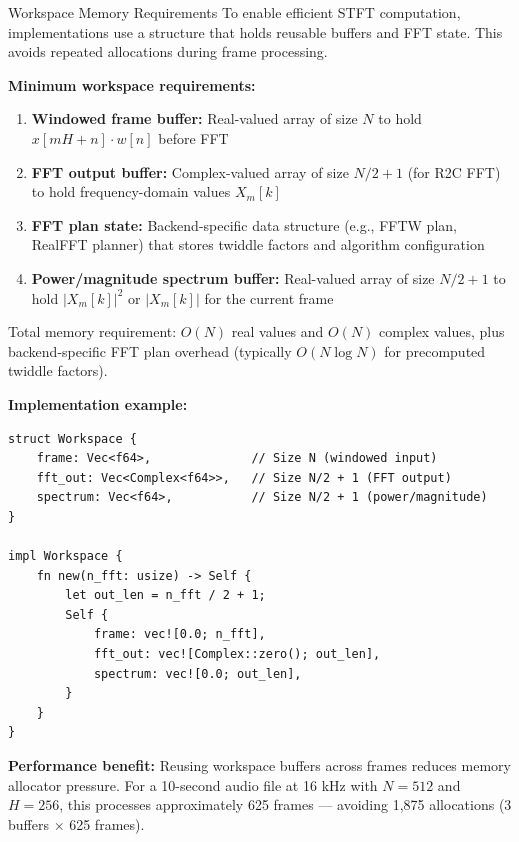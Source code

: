 \begin{concept}{Workspace Memory Requirements}
  To enable efficient STFT computation, implementations use a
   structure that holds reusable buffers and FFT
  state. This avoids repeated allocations during frame processing.

  \textbf{Minimum workspace requirements:}
  \begin{enumerate}[itemsep=2pt]
    \item \textbf{Windowed frame buffer:} Real-valued array of size
      $N$ to hold $x[mH + n] \cdot w[n]$ before FFT
    \item \textbf{FFT output buffer:} Complex-valued array of size
      $N/2 + 1$ (for R2C FFT) to hold frequency-domain values $X_m[k]$
    \item \textbf{FFT plan state:} Backend-specific data structure
      (e.g., FFTW plan, RealFFT planner) that stores twiddle factors
      and algorithm configuration
    \item \textbf{Power/magnitude spectrum buffer:} Real-valued array
      of size $N/2 + 1$ to hold $|X_m[k]|^2$ or $|X_m[k]|$ for the
      current frame
  \end{enumerate}

  Total memory requirement: $O(N)$ real values and $O(N)$ complex
  values, plus backend-specific FFT plan overhead (typically $O(N
  \log N)$ for precomputed twiddle factors).

  \textbf{Implementation example:}

  \begin{lstlisting}[caption={Workspace struct with reusable STFT buffers}]
struct Workspace {
    frame: Vec<f64>,              // Size N (windowed input)
    fft_out: Vec<Complex<f64>>,   // Size N/2 + 1 (FFT output)
    spectrum: Vec<f64>,           // Size N/2 + 1 (power/magnitude)
}

impl Workspace {
    fn new(n_fft: usize) -> Self {
        let out_len = n_fft / 2 + 1;
        Self {
            frame: vec![0.0; n_fft],
            fft_out: vec![Complex::zero(); out_len],
            spectrum: vec![0.0; out_len],
        }
    }
}
  \end{lstlisting}

  \textbf{Performance benefit:} Reusing workspace buffers across
  frames reduces memory allocator pressure. For a 10-second audio
  file at 16 kHz with $N=512$ and $H=256$, this processes
  approximately 625 frames --- avoiding 1,875 allocations (3 buffers
  $\times$ 625 frames).
\end{concept}

